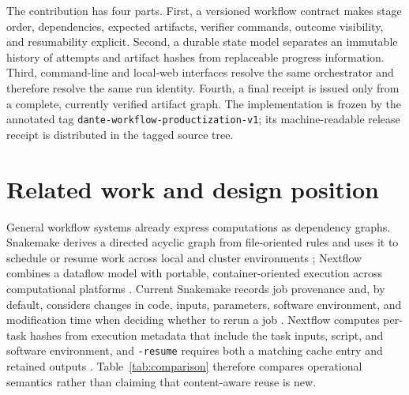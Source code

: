 \documentclass[aps,prd,twocolumn,superscriptaddress,nofootinbib,amsmath,amssymb,floatfix,10pt]{revtex4-2}
\begin{document}
The contribution has four parts.  First, a versioned workflow contract makes
stage order, dependencies, expected artifacts, verifier commands, outcome
visibility, and resumability explicit.  Second, a durable state model separates
an immutable history of attempts and artifact hashes from replaceable progress
information.  Third, command-line and local-web interfaces resolve the same
orchestrator and therefore resolve the same run identity.  Fourth, a final receipt
is issued only from a complete, currently verified artifact graph.  The
implementation is frozen by the annotated tag
\texttt{dante-workflow-productization-v1}; its machine-readable release receipt
is distributed in the tagged source tree.

\section{Related work and design position}
\label{sec:related}

General workflow systems already express computations as dependency graphs.
Snakemake derives a directed acyclic graph from file-oriented rules and uses it
to schedule or resume work across local and cluster environments
\cite{koster2012snakemake}; Nextflow combines a dataflow model with portable,
container-oriented execution across computational platforms
\cite{ditommaso2017nextflow}.  Current Snakemake records job provenance and, by
default, considers changes in code, inputs, parameters, software environment,
and modification time when deciding whether to rerun a job
\cite{snakemake2026cli}.  Nextflow computes per-task hashes from execution
metadata that include the task inputs, script, and software environment, and
\texttt{-resume} requires both a matching cache entry and retained outputs
\cite{nextflow2026cache}.  Table~\ref{tab:comparison} therefore compares
operational semantics rather than claiming that content-aware reuse is new.
\end{document}
